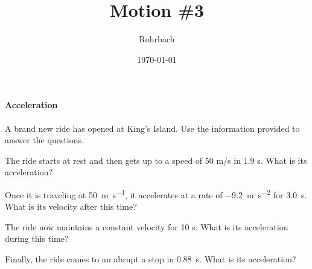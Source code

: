 \documentclass[10pt]{exam}
\title{Motion \#3}
\author{Rohrbach}
\date{\today}
\begin{document}
\maketitle

\vspace{-2em}
\begin{questions}

  

  \begin{EnvUplevel}
    \paragraph{Acceleration}
      A brand new ride has opened at King's Island.  Use the information provided to answer the questions.
  \end{EnvUplevel}

  \question
    The ride starts at rest and then gets up to a speed of 50 m/s in 1.9 s.  What is its acceleration?
    \vs

  \question
    Once it is traveling at \SI{50}{\meter\per\second}, it accelerates at a rate of \SI{-9.2}{\meter\per\second^2} for \SI{3.0}{\second}.  What is its velocity after this time?
    \vs

  \question
    The ride now maintains a constant velocity for 10 s.  What is its acceleration during this time?
    \vs

  \question
    Finally, the ride comes to an abrupt a stop in \SI{0.88}{\second}. What is its acceleration?
    \vs


 
\end{questions}
\end{document}
